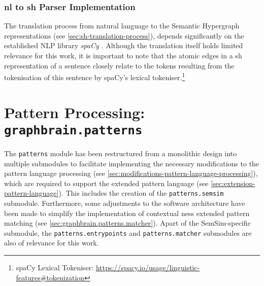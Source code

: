 \documentclass[11pt, numbers=noenddot]{scrreprt}
\let\cite\parencite  %
\begin{document}
\subsubsection{\gls{nl} to \gls{sh} Parser Implementation}
\label{sec:nl-to-sh-parser-implementation}
The translation process from natural language to the Semantic Hypergraph representations (see \cref{sec:sh-translation-process}), depends significantly on the established NLP library \textit{spaCy} \cite{honnibal2020spacy}. Although the translation itself holds limited relevance for this work, it is important to note that the atomic edges in a \gls{sh} representation of a sentence closely relate to the tokens resulting from the tokenisation of this sentence by spaCy's lexical tokeniser.\footnote{spaCy Lexical Tokeniser: \url{https://spacy.io/usage/linguistic-features\#tokenization}}


%
%


\section{Pattern Processing: \texttt{graphbrain.patterns}}
The \texttt{patterns} module has been restructured from a monolithic design into multiple submodules to facilitate implementing the necessary modifications to the pattern language processing (see \cref{sec:modifications-pattern-language-processing}), which are required to support the extended pattern language (see \cref{sec:extension-pattern-language}). This includes the creation of the \texttt{patterns.semsim} submodule. Furthermore, some adjustments to the software architecture have been made to simplify the implementation of contextual \gls{ness} extended pattern matching (see \cref{sec:graphbrain.patterns.matcher}). Apart of the SemSim-specific submodule, the \texttt{patterns.entrypoints} and \texttt{patterns.matcher} submodules are also of relevance for this work.
\end{document}
